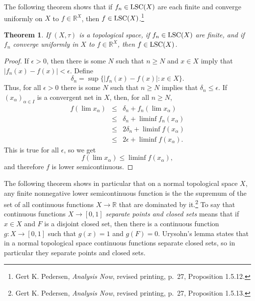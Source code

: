 \documentclass{article}
\newcommand{\LSC}{\ensuremath\mathrm{LSC}}
\newtheorem{theorem}{Theorem}
\theoremstyle{definition}
\begin{document}
The following theorem shows that if $f_n \in \LSC(X)$ are each finite and converge uniformly on $X$ to $f \in \mathbb{R}^X$, then $f \in \LSC(X)$.\footnote{Gert K. Pedersen, {\em Analysis Now}, revised printing, p.~27, Proposition 1.5.12.}


\begin{theorem}
If $(X,\tau)$ is a topological space, if $f_n \in \LSC(X)$ are finite, and if $f_n$ converge uniformly in $X$ to $f \in \mathbb{R}^X$, then $f \in \LSC(X)$.
\end{theorem}
\begin{proof}
If $\epsilon>0$, then there is some $N$ such that $n \geq N$ and $x \in X$ imply that 
$|f_n(x)-f(x)| < \epsilon$. Define
\[
\delta_n = \sup \{|f_n(x)-f(x)|:x \in X\}.
\]
Thus, for all $\epsilon>0$ there is some $N$ such that $n \geq N$ implies that $\delta_n \leq \epsilon$. If $(x_\alpha)_{\alpha \in I}$ is a convergent net in $X$, then, for all $n \geq N$,
\begin{eqnarray*}
f(\lim x_\alpha)&\leq&\delta_n + f_n(\lim x_\alpha)\\
&\leq&\delta_n+\liminf f_n(x_\alpha)\\
&\leq&2\delta_n + \liminf f(x_\alpha)\\
&\leq&2\epsilon+\liminf f(x_\alpha).
\end{eqnarray*}
This is true for all $\epsilon$, so we get 
\[
f(\lim x_\alpha) \leq \liminf f(x_\alpha),
\]
and therefore $f$ is lower semicontinuous.
\end{proof}


The following theorem shows in particular that on a normal topological space $X$, any finite nonnegative lower semicontinuous function is the the supremum of the set of all continuous
functions
$X \to \mathbb{R}$ that are dominated by it.\footnote{Gert K. Pedersen, {\em Analysis Now}, revised printing, p.~27, Proposition 1.5.13.}
To say that continuous functions $X \to [0,1]$ {\em separate points and closed sets} means that if $x \in X$ and $F$ is a disjoint closed set, then there is a continuous function
$g:X \to [0,1]$ such that $g(x)=1$ and $g(F)=0$. Urysohn's lemma states that in a normal topological space continuous functions separate closed sets, so in particular they separate
points and closed sets.
\end{document}
